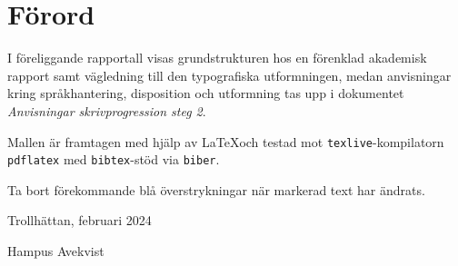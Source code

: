 \thispagestyle{plain}

\section{Förord}
I föreliggande rapportall visas grundstrukturen hos en förenklad akademisk
rapport samt vägledning till den typografiska utformningen, medan anvisningar
kring språkhantering, disposition och utformning tas upp i dokumentet
\textit{Anvisningar skrivprogression steg 2}.

Mallen är framtagen med hjälp av \LaTeX och testad mot 
\verb|texlive|-kompilatorn \verb|pdflatex| med \verb|bibtex|-stöd via
\verb|biber|.

Ta bort förekommande blå överstrykningar när markerad text har ändrats. 

\vspace{1cm}

Trollhättan, februari 2024

Hampus Avekvist

